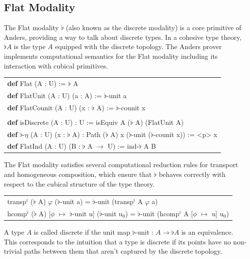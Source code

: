 \documentclass[a4paper,UKenglish,cleveref, autoref, thm-restate]{lipics-v2021}
\newcommand{\tabstyle}[0]{\scriptsize\ttfamily\fontseries{l}\selectfont}
\begin{document}
\subsection{Flat Modality}

The Flat modality $\flat$ (also known as the discrete modality) is a core primitive of Anders,
providing a way to talk about discrete types. In a cohesive type theory, $\flat A$
is the type $A$ equipped with the discrete topology. The Anders prover implements
computational semantics for the Flat modality including its interaction with cubical primitives.

\begin{table}[ht!]
\tabstyle
\begin{tabular}{l}
\textbf{def} Flat (A : U) := $\flat$ A \\
\textbf{def} FlatUnit (A : U) (a : A) := $\flat$-unit a \\
\textbf{def} FlatCounit (A : U) (x : $\flat$ A) := $\flat$-counit x \\
\\
\textbf{def} isDiscrete (A : U) : U := isEquiv A ($\flat$ A) (FlatUnit A) \\
\textbf{def} $\flat$-$\eta$ (A : U) (x : $\flat$ A) : Path ($\flat$ A) x ($\flat$-unit ($\flat$-counit x)) := <p> x \\
\textbf{def} FlatInd (A : U) (B : $\flat$ A $\rightarrow$ U) := ind-$\flat$ A B \\
\end{tabular}
\end{table}

The Flat modality satisfies several computational reduction rules for transport and
homogeneous composition, which ensure that $\flat$ behaves correctly with respect to the
cubical structure of the type theory.

\begin{table}[ht!]
\tabstyle
\begin{tabular}{l}
transp$^{i}$ ($\flat$ A) $\varphi$ ($\flat$-unit a) = $\flat$-unit (transp$^i$ A $\varphi$ a) \\
hcomp$^{i}$ ($\flat$ A) [$\phi$ $\mapsto$ $\flat$-unit u] ($\flat$-unit u$_0$) = $\flat$-unit (hcomp$^i$ A [$\phi$ $\mapsto$ u] u$_0$) \\
\end{tabular}
\end{table}

\begin{definition}[Discreteness]
A type $A$ is called discrete if the unit map $\flat$-unit : $A \rightarrow \flat A$ is an equivalence.
This corresponds to the intuition that a type is discrete if its points have no non-trivial paths between them
that aren't captured by the discrete topology.
\end{definition}
\end{document}
